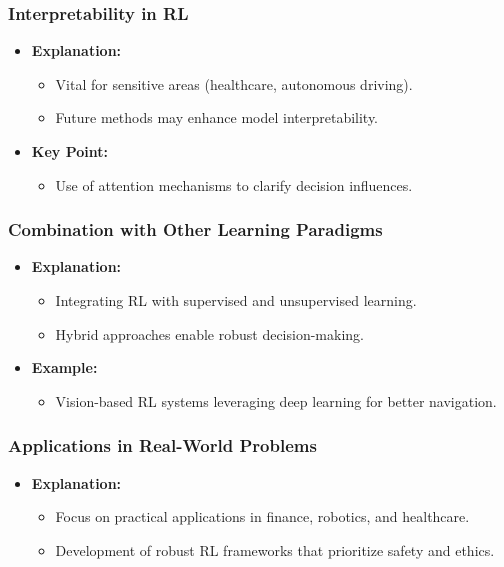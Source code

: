 \documentclass[aspectratio=169]{beamer}
\begin{document}
\begin{frame}[fragile]
    \frametitle{Interpretability in RL}
    \begin{itemize}
        \item \textbf{Explanation:}
        \begin{itemize}
            \item Vital for sensitive areas (healthcare, autonomous driving).
            \item Future methods may enhance model interpretability.
        \end{itemize}
        \item \textbf{Key Point:}
        \begin{itemize}
            \item Use of attention mechanisms to clarify decision influences.
        \end{itemize}
    \end{itemize}
\end{frame}

\begin{frame}[fragile]
    \frametitle{Combination with Other Learning Paradigms}
    \begin{itemize}
        \item \textbf{Explanation:}
        \begin{itemize}
            \item Integrating RL with supervised and unsupervised learning.
            \item Hybrid approaches enable robust decision-making.
        \end{itemize}
        \item \textbf{Example:}
        \begin{itemize}
            \item Vision-based RL systems leveraging deep learning for better navigation.
        \end{itemize}
    \end{itemize}
\end{frame}

\begin{frame}[fragile]
    \frametitle{Applications in Real-World Problems}
    \begin{itemize}
        \item \textbf{Explanation:}
        \begin{itemize}
            \item Focus on practical applications in finance, robotics, and healthcare.
            \item Development of robust RL frameworks that prioritize safety and ethics.
        \end{itemize}
    \end{itemize}
\end{frame}
\end{document}
